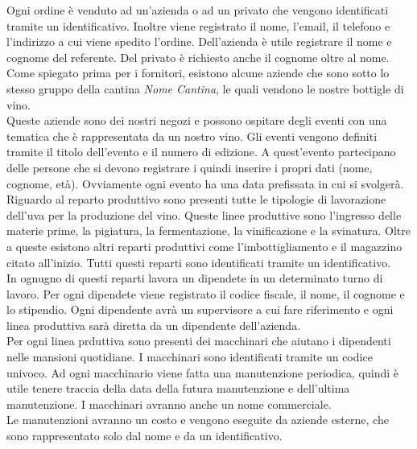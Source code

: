 Ogni ordine è venduto ad un'azienda o ad un privato che vengono identificati tramite un identificativo. Inoltre viene registrato il nome, l'email, il telefono e l'indirizzo a cui viene spedito l'ordine. Dell'azienda è utile registrare il nome e cognome del referente. Del privato è richiesto anche il cognome oltre al nome. Come spiegato prima per i fornitori, esistono alcune aziende che sono sotto lo stesso gruppo della cantina \emph{Nome Cantina}, le quali vendono le nostre bottigle di vino.\\
Queste aziende sono dei nostri negozi e possono ospitare degli eventi con una tematica che è rappresentata da un nostro vino. Gli eventi vengono definiti tramite il titolo dell'evento e il numero di edizione. A quest'evento partecipano delle persone che si devono registrare i quindi inserire i propri dati (nome, cognome, età). Ovviamente ogni evento ha una data prefissata in cui si svolgerà.\\
Riguardo al reparto produttivo sono presenti tutte le tipologie di lavorazione dell'uva per la produzione del vino. Queste linee produttive sono l'ingresso delle materie prime, la pigiatura, la fermentazione, la vinificazione e la svinatura. Oltre a queste esistono altri reparti produttivi come l'imbottigliamento e il magazzino citato all'inizio. Tutti questi reparti sono identificati tramite un identificativo.\\
In ognugno di questi reparti lavora un dipendete in un determinato turno di lavoro. Per ogni dipendete viene registrato il codice fiscale, il nome, il cognome e lo stipendio. Ogni dipendente avrà un supervisore a cui fare riferimento e ogni linea produttiva sarà diretta da un dipendente dell'azienda.\\
Per ogni linea prduttiva sono presenti dei macchinari che aiutano i dipendenti nelle mansioni quotidiane. I macchinari sono identificati tramite un codice univoco. Ad ogni macchinario viene fatta una manutenzione periodica, quindi è utile tenere traccia della data della futura manutenzione e dell'ultima manutenzione. I macchinari avranno anche un nome commerciale.\\
Le manutenzioni avranno un costo e vengono eseguite da aziende esterne, che sono rappresentato solo dal nome e da un identificativo.